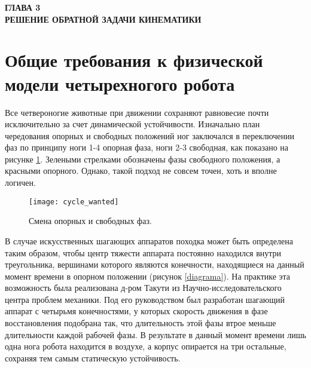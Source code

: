 
\begin{center}
	\textbf{\large ГЛАВА 3 \\ РЕШЕНИЕ ОБРАТНОЙ ЗАДАЧИ КИНЕМАТИКИ}
\end{center}


\section{Общие требования к физической модели четырехногого робота}\label{C4_1}

Все четвероногие животные при движении сохраняют равновесие почти исключительно за счет динамической устойчивости. Изначально план чередования опорных и свободных положений ног заключался в переключении фаз по принципу ноги 1-4 опорная фаза, ноги 2-3 свободная, как показано на рисунке \ref{cycle_wanted}. Зелеными стрелками обозначены фазы свободного положения, а красными опорного. Однако, такой подход не совсем точен, хоть и вполне логичен.
\begin{figure}[h!]
	\begin{center}
		\texttt{[image: cycle\_wanted]}
		\caption{Смена опорных и свободных фаз.}
		\label{cycle_wanted}
	\end{center}
\end{figure}

В случае искусственных шагающих аппаратов походка может быть определена таким образом, чтобы центр тяжести аппарата постоянно находился внутри треугольника, вершинами которого являются конечности, находящиеся на данный момент времени в опорном положении (рисунок \ref{diagrama}). На практике эта возможность была реализована д-ром Такути из Научно-исследовательского центра проблем механики\cite{Nakano}. Под его руководством был разработан шагающий аппарат с четырьмя конечностями, у которых скорость движения в фазе восстановления подобрана так, что длительность этой фазы втрое меньше длительности каждой рабочей фазы. В результате в данный момент времени лишь одна нога робота находится в воздухе, а корпус опирается на три остальные, сохраняя тем самым статическую устойчивость. 

